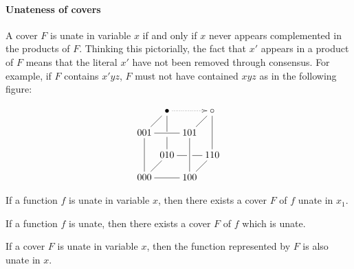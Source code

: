 \documentclass{myproc}
\begin{document}
\paragraph{Unateness of covers}
A cover $F$ is unate in variable $x$ if and only if 
$x$ never appears complemented in the products of $F$.
Thinking this pictorially, the fact that $x'$ appears
in a product of $F$ means that the literal $x'$ have not been removed
through consensus. For example, if $F$ contains $x'yz$, 
$F$ must not have contained $xyz$ as in the following figure:

{\tiny
\[\xymatrix@!@-1.8pc{
& \mbox{\normalsize $\bullet$} \ar@{.>}[rr]\ar@{-}'[d][dd]
	& & \mbox{\normalsize $\circ$} \ar@{-}[dd] \\
001 \ar@{-}[ur]\ar@{-}[rr]\ar@{-}[dd]
	& & 101 \ar@{-}[ur]\ar@{-}[dd] \\
& 010 \ar@{-} \ar@{-}'[r][rr]
	& & 110\\
000\ar@{-}[rr]\ar@{-}[ur]
& & 100 \ar@{-}[ur]
}\]}


\begin{lemma}\label{lemma:function}
{\rm If a function $f$ is unate in variable $x$, then there exists a cover
$F$ of $f$ unate in $x_1$.}
\end{lemma}



\begin{theorem}
{\rm If a function $f$ is unate, then there exists a  cover $F$ of
$f$ which is unate.}
\end{theorem}



\begin{lemma}\label{lemma:cover}
{\rm If a cover $F$ is unate in variable $x$, 
then the function represented by $F$ is also unate in $x$.}
\end{lemma}
\end{document}
